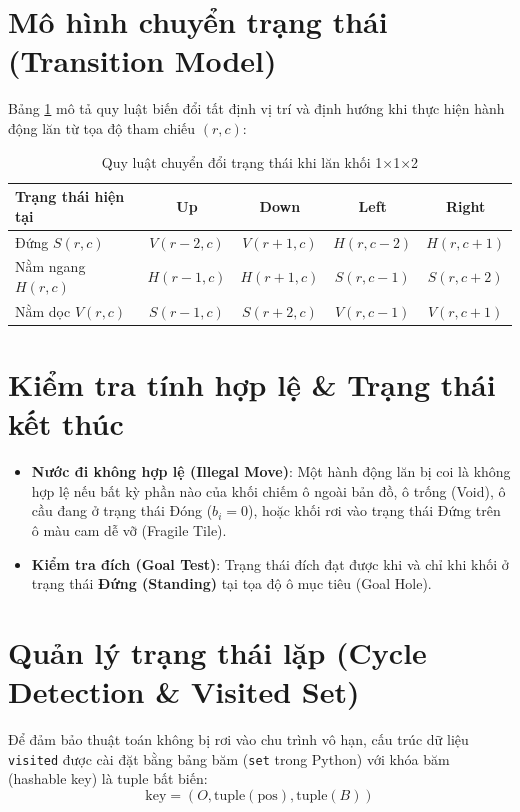 \section{Mô hình chuyển trạng thái (Transition Model)}
Bảng \ref{tab:transition_rules} mô tả quy luật biến đổi tất định vị trí và định hướng khi thực hiện hành động lăn từ tọa độ tham chiếu $(r, c)$:

\begin{table}[htbp]
\centering
\caption{Quy luật chuyển đổi trạng thái khi lăn khối 1×1×2}
\label{tab:transition_rules}
\small
\begin{tabular}{lcccc}
\toprule
\textbf{Trạng thái hiện tại} & \textbf{Up} & \textbf{Down} & \textbf{Left} & \textbf{Right} \\
\midrule
Đứng $S(r, c)$ & $V(r-2, c)$ & $V(r+1, c)$ & $H(r, c-2)$ & $H(r, c+1)$ \\
Nằm ngang $H(r, c)$ & $H(r-1, c)$ & $H(r+1, c)$ & $S(r, c-1)$ & $S(r, c+2)$ \\
Nằm dọc $V(r, c)$ & $S(r-1, c)$ & $S(r+2, c)$ & $V(r, c-1)$ & $V(r, c+1)$ \\
\bottomrule
\end{tabular}
\end{table}

\section{Kiểm tra tính hợp lệ \& Trạng thái kết thúc}
\begin{itemize}
    \item \textbf{Nước đi không hợp lệ (Illegal Move)}: Một hành động lăn bị coi là không hợp lệ nếu bất kỳ phần nào của khối chiếm ô ngoài bản đồ, ô trống (Void), ô cầu đang ở trạng thái Đóng ($b_i = 0$), hoặc khối rơi vào trạng thái Đứng trên ô màu cam dễ vỡ (Fragile Tile).
    \item \textbf{Kiểm tra đích (Goal Test)}: Trạng thái đích đạt được khi và chỉ khi khối ở trạng thái \textbf{Đứng (Standing)} tại tọa độ ô mục tiêu (Goal Hole).
\end{itemize}

\section{Quản lý trạng thái lặp (Cycle Detection \& Visited Set)}
Để đảm bảo thuật toán không bị rơi vào chu trình vô hạn, cấu trúc dữ liệu \texttt{visited} được cài đặt bằng bảng băm (\texttt{set} trong Python) với khóa băm (hashable key) là tuple bất biến:
\begin{equation}
    \text{key} = (O, \text{tuple}(\text{pos}), \text{tuple}(B))
\end{equation}
